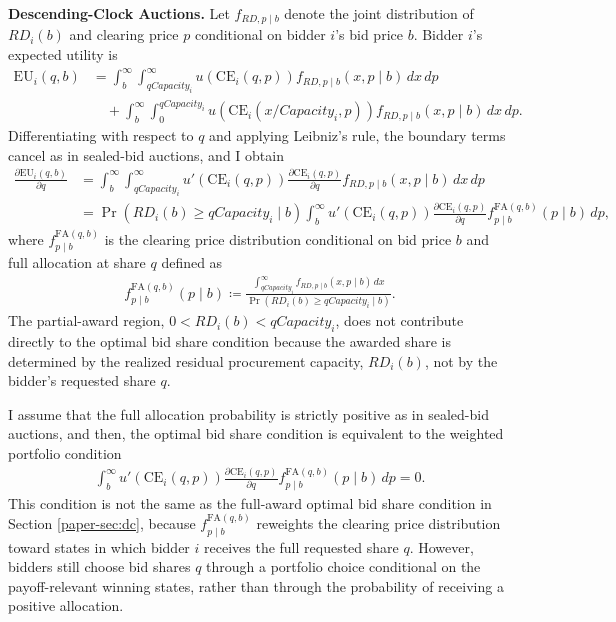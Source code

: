 \documentclass[12pt]{article}
\theoremstyle{definition} %
\begin{document}
\textbf{Descending-Clock Auctions.}
Let $f_{RD,p \mid b}$ denote the joint distribution of $RD_i(b)$ and clearing price $p$ conditional on bidder $i$'s bid price $b$. Bidder $i$'s expected utility is
\begin{align*}
\mathrm{EU}_i(q,b)
&= \int_{b}^{\infty}
\int_{q Capacity_i}^{\infty}
u(\mathrm{CE}_i(q,p)) f_{RD,p \mid b}(x,p \mid b)\, dx\, dp \\
&\quad + \int_{b}^{\infty}
\int_{0}^{q Capacity_i}
u(\mathrm{CE}_i(x/Capacity_i,p)) f_{RD,p \mid b}(x,p \mid b)\, dx\, dp .
\end{align*}
Differentiating with respect to $q$ and applying Leibniz's rule, the boundary terms cancel as in sealed-bid auctions, and I obtain
\begin{align*}
\frac{\partial \mathrm{EU}_i(q,b)}{\partial q}
&= \int_{b}^{\infty}
\int_{q Capacity_i}^{\infty}
u'(\mathrm{CE}_i(q,p))
\frac{\partial \mathrm{CE}_i(q,p)}{\partial q}
f_{RD,p \mid b}(x,p \mid b)\, dx\, dp \\
&= \Pr(RD_i(b)\geq q Capacity_i \mid b)
\int_{b}^{\infty}
u'(\mathrm{CE}_i(q,p))
\frac{\partial \mathrm{CE}_i(q,p)}{\partial q}
f_{p \mid b}^{\mathrm{FA}(q,b)}(p \mid b)\, dp,
\end{align*}
where $f_{p \mid b}^{\mathrm{FA}(q,b)}$ is the clearing price distribution conditional on bid price $b$ and full allocation at share $q$ defined as
\begin{align*}
f_{p \mid b}^{\mathrm{FA}(q,b)}(p \mid b)
\coloneqq
\frac{\int_{q Capacity_i}^{\infty} f_{RD,p \mid b}(x,p \mid b)\, dx}
{\Pr(RD_i(b)\geq q Capacity_i \mid b)}.
\end{align*}
The partial-award region, $0<RD_i(b)<q Capacity_i$, does not contribute directly to the optimal bid share condition because the awarded share is determined by the realized residual procurement capacity, $RD_i(b)$, not by the bidder's requested share $q$.

I assume that the full allocation probability is strictly positive as in sealed-bid auctions, and then, the optimal bid share condition is equivalent to the weighted portfolio condition
\begin{align*}
\int_{b}^{\infty}
u'(\mathrm{CE}_i(q,p))
\frac{\partial \mathrm{CE}_i(q,p)}{\partial q}
f_{p \mid b}^{\mathrm{FA}(q,b)}(p \mid b)\, dp = 0.
\end{align*}
This condition is not the same as the full-award optimal bid share condition in Section \ref{paper-sec:dc}, because $f_{p \mid b}^{\mathrm{FA}(q,b)}$ reweights the clearing price distribution toward states in which bidder $i$ receives the full requested share $q$. However, bidders still choose bid shares $q$ through a portfolio choice conditional on the payoff-relevant winning states, rather than through the probability of receiving a positive allocation.
\end{document}

